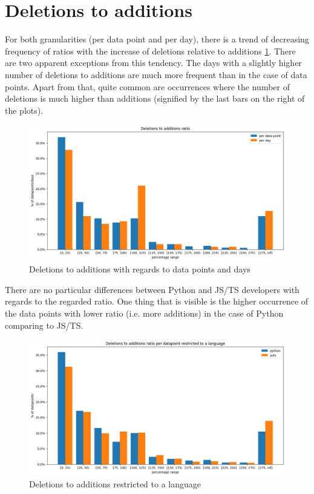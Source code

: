 \section{Deletions to additions}

For both granularities (per data point and per day), there is a trend of decreasing frequency of ratios with the increase of deletions relative to additions \ref{fig:del_to_add}. There are two apparent exceptions from this tendency. The days with a slightly higher number of deletions to additions are much more frequent than in the case of data points. Apart from that, quite common are occurrences where the number of deletions is much higher than additions (signified by the last bars on the right of the plots).

\begin{figure}[htbp]
  \centering
  \includegraphics[scale=0.5]{chapters/results/graphics/del-to-add.png}
  \caption{Deletions to additions with regards to data points and days}
  \label{fig:del_to_add}
\end{figure}

There are no particular differences between Python and JS/TS developers with regards to the regarded ratio. One thing that is visible is the higher occurrence of the data points with lower ratio (i.e. more additions) in the case of Python comparing to JS/TS.

\begin{figure}[htbp]
  \centering
  \includegraphics[scale=0.5]{chapters/results/graphics/del-to-add-langs.png}
  \caption{Deletions to additions restricted to a language}
  \label{fig:del_to_add_langs}
\end{figure}
